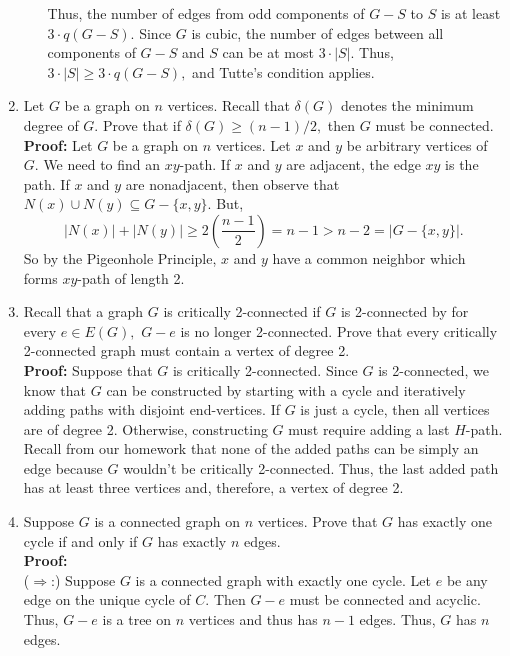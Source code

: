 \documentclass[12pt]{article}
\begin{document}
\begin{enumerate}
\begin{enumerate}
Thus, the number of edges from odd components of $G-S$ to $S$ is at least $3\cdot q(G-S).$  Since $G$ is cubic, the number of edges between all components of $G-S$ and $S$ can be at most $3 \cdot |S|$. Thus, $3 \cdot |S| \geq 3 \cdot q(G-S),$ and Tutte's condition applies.\\

	\end{enumerate}
\item Let $G$ be a graph on $n$ vertices. Recall that $\delta(G)$ denotes the minimum degree of $G.$ Prove that if  $\delta(G) \geq (n-1)/2,$ then $G$ must be connected. \\

\textbf{Proof:} Let $G$ be a graph on $n$ vertices. Let $x$ and $y$ be arbitrary vertices of $G.$ We need to find an $xy$-path. If $x$ and $y$ are adjacent, the edge $xy$ is the path. If $x$ and $y$ are nonadjacent, then observe that $N(x) \cup N(y) \subseteq G-\{x,y\}.$ But, $$|N(x)| + |N(y)| \geq 2\left(\frac{n-1}{2}\right)=n-1> n-2 = |G-\{x,y\}|.$$ So by the Pigeonhole Principle, $x$ and $y$ have a common neighbor which forms $xy$-path of length 2.\\

\newpage
\item Recall that a graph $G$ is critically 2-connected if $G$ is 2-connected by for every $e \in E(G),$ $G-e$ is no longer 2-connected. Prove that every critically 2-connected graph must contain a vertex of degree 2.\\

\textbf{Proof:} Suppose that $G$ is critically 2-connected. Since $G$ is 2-connected, we know that $G$ can be constructed by starting with a cycle and iteratively adding paths with disjoint end-vertices. If $G$ is just a cycle, then all vertices are of degree 2. Otherwise, constructing $G$ must require adding a last $H$-path. Recall from our homework that none of the added paths can be simply an edge because $G$ wouldn't be critically 2-connected. Thus, the last added path has at least three vertices and, therefore, a vertex of degree 2. \\

\item Suppose $G$ is a connected graph on $n$ vertices. Prove that $G$ has exactly one cycle if and only if $G$ has exactly $n$ edges.\\

\textbf{Proof:} \\

($\Longrightarrow$:) Suppose $G$ is a connected graph with exactly one cycle. Let $e$ be any edge on the unique cycle of $C.$ Then $G-e$ must be connected and acyclic. Thus, $G-e$ is a tree on $n$ vertices and thus has $n-1$ edges. Thus, $G$ has $n$ edges.\\


\end{enumerate}
\end{document}
